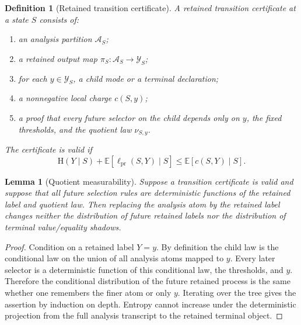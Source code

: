 \documentclass[11pt]{article}
\newtheorem{lemma}[theorem]{Lemma}
\newtheorem{definition}[theorem]{Definition}
\theoremstyle{remark}
\newcommand{\E}{\mathbb E}
\newcommand{\HH}{\mathrm H}
\newcommand{\pr}{\mathrm{pr}}
\begin{document}
\begin{definition}[Retained transition certificate]\label{def:rtc}
A retained transition certificate at a state $S$ consists of:
\begin{enumerate}[label=\textup{(\roman*)}]
\item an analysis partition $\mathcal A_S$;
\item a retained output map $\pi_S:\mathcal A_S\to\mathcal Y_S$;
\item for each $y\in\mathcal Y_S$, a child mode or a terminal declaration;
\item a nonnegative local charge $c(S,y)$;
\item a proof that every future selector on the child depends only on $y$, the fixed thresholds, and the quotient law $\nu_{S,y}$.
\end{enumerate}
The certificate is valid if
\[
        \HH(Y\mid S)+\E[\ell_{\pr}(S,Y)\mid S]\le \E[c(S,Y)\mid S].
\]
\end{definition}

\begin{lemma}[Quotient measurability]\label{lem:quotient-meas-app}
Suppose a transition certificate is valid and suppose that all future selection rules are deterministic functions of the retained label and quotient law.  Then replacing the analysis atom by the retained label changes neither the distribution of future retained labels nor the distribution of terminal value/equality shadows.
\end{lemma}

\begin{proof}
Condition on a retained label $Y=y$.  By definition the child law is the conditional law on the union of all analysis atoms mapped to $y$.  Every later selector is a deterministic function of this conditional law, the thresholds, and $y$.  Therefore the conditional distribution of the future retained process is the same whether one remembers the finer atom or only $y$.  Iterating over the tree gives the assertion by induction on depth.  Entropy cannot increase under the deterministic projection from the full analysis transcript to the retained terminal object.
\end{proof}
\end{document}
